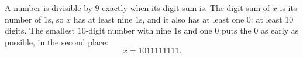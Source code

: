 A number is divisible by $9$ exactly when its digit sum is. The digit sum of $x$ is its number of $1$s, so $x$ has at least nine $1$s, and it also has at least one $0$: at least $10$ digits. The smallest $10$-digit number with nine $1$s and one $0$ puts the $0$ as early as possible, in the second place:
\[
x=\boxed{1011111111}.
\]
